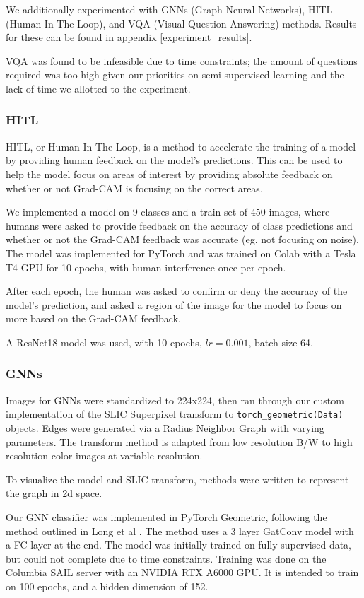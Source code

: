 \documentclass{article}
\begin{document}
We additionally experimented with GNNs (Graph Neural Networks), HITL (Human In The Loop), and VQA (Visual Question Answering) methods. Results for these can be found in appendix \ref{experiment_results}.

VQA was found to be infeasible due to time constraints; the amount of questions required was too high given our priorities on semi-supervised learning and the lack of time we allotted to the experiment.

\subsubsection{HITL}

HITL, or Human In The Loop, is a method to accelerate the training of a model by providing human feedback on the model's predictions. This can be used to help the model focus on areas of interest by providing absolute feedback on whether or not Grad-CAM is focusing on the correct areas.

We implemented a model on 9 classes and a train set of 450 images, where humans were asked to provide feedback on the accuracy of class predictions and whether or not the Grad-CAM feedback was accurate (eg. not focusing on noise). The model was implemented for PyTorch and was trained on Colab with a Tesla T4 GPU for 10 epochs, with human interference once per epoch. 

After each epoch, the human was asked to confirm or deny the accuracy of the model's prediction, and asked a region of the image for the model to focus on more based on the Grad-CAM feedback.

A ResNet18 model was used, with 10 epochs, $lr=0.001$, batch size 64. 

\subsubsection{GNNs}

Images for GNNs were standardized to 224x224, then ran through our custom implementation of the SLIC Superpixel transform to \verb*|torch_geometric(Data)| objects. Edges were generated via a Radius Neighbor Graph with varying parameters. The transform method is adapted from low resolution B/W to high resolution color images at variable resolution.

To visualize the model and SLIC transform, methods were written to represent the graph in 2d space.

Our GNN classifier was implemented in PyTorch Geometric, following the method outlined in Long et al \cite{long}. The method uses a 3 layer GatConv model with a FC layer at the end. The model was initially trained on fully supervised data, but could not complete due to time constraints. Training was done on the Columbia \@ SAIL server with an NVIDIA RTX A6000 GPU. It is intended to train on 100 epochs, and a hidden dimension of 152. 
\end{document}
